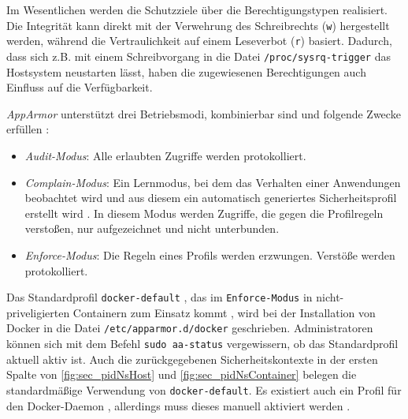 \documentclass[../main.tex]{subfiles}
\begin{document}
				Im Wesentlichen werden die Schutzziele über die Berechtigungstypen realisiert. Die Integrität kann direkt mit der Verwehrung des Schreibrechts (\texttt{w}) hergestellt werden, während die Vertraulichkeit auf einem Leseverbot (\texttt{r}) basiert. Dadurch, dass sich z.B. mit einem Schreibvorgang in die Datei \texttt{/proc/sysrq-trigger} das Hostsystem neustarten lässt, haben die zugewiesenen Berechtigungen auch Einfluss auf die Verfügbarkeit.


				\emph{AppArmor} unterstützt drei Betriebsmodi, kombinierbar sind und folgende Zwecke erfüllen \cite[S.82]{SELinuxApparmor}:
				\begin{itemize}
					\item \emph{Audit-Modus}: Alle erlaubten Zugriffe werden protokolliert.
					\item \emph{Complain-Modus}: Ein Lernmodus, bei dem das Verhalten einer Anwendungen beobachtet wird und aus diesem ein automatisch generiertes Sicherheitsprofil erstellt wird \cite{linuxSecOverview}. In diesem Modus werden Zugriffe, die gegen die Profilregeln verstoßen, nur aufgezeichnet und nicht unterbunden.
					\item \emph{Enforce-Modus}: Die Regeln eines Profils werden erzwungen. Verstöße werden protokolliert.
				\end{itemize}


				Das Standardprofil \texttt{docker-default} \cite{githubAppArmorProfileContainer}, das im \texttt{Enforce-Modus} in nicht-priveligierten Containern zum Einsatz kommt \cite{docker110Security}, wird bei der Installation von Docker in die Datei \texttt{/etc/apparmor.d/docker} geschrieben. Administratoren können sich mit dem Befehl \texttt{sudo aa-status} vergewissern, ob das Standardprofil aktuell aktiv ist. Auch die zurückgegebenen Sicherheitskontexte in der ersten Spalte von \fig \ref{fig:sec_pidNsHost} und \fig \ref{fig:sec_pidNsContainer} belegen die standardmäßige Verwendung von \texttt{docker-default}. Es existiert auch ein Profil für den Docker-Daemon \cite{githubAppArmorProfileDaemon}, allerdings muss dieses manuell aktiviert werden \cite{githubAppArmorDoc}.
\end{document}

